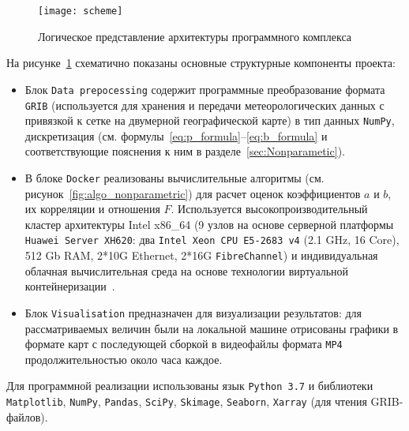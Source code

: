 \begin{figure}[!h]
	\centering
	\texttt{[image: scheme]}
	\caption{Логическое представление архитектуры программного комплекса}\label{fig:app_scheme}
\end{figure}


На рисунке~\ref{fig:app_scheme} схематично показаны основные структурные компоненты проекта:
\begin{itemize}
	\item Блок \verb"Data prepocessing" содержит программные преобразование формата \verb"GRIB" (используется для хранения и передачи метеорологических данных с привязкой к сетке на двумерной географической карте) в тип данных \verb"NumPy", дискретизация (см. формулы~\eqref{eq:p_formula}--\eqref{eq:b_formula} и соответствующие пояснения к ним в разделе~\ref{sec:Nonparametic}).
	\item В блоке \verb"Docker" реализованы вычислительные алгоритмы (см. рисунок~\ref{fig:algo_nonparametric}) для расчет оценок коэффициентов $a$ и $b$, их корреляции и отношения $F$. Используется высокопроизводительный кластер архитектуры Intel x86\_64 (9 узлов на основе серверной платформы \verb"Huawei Server XH620": два \verb"Intel Xeon CPU E5-2683 v4" (2.1 GHz, 16 Core), 512 Gb RAM, 2*10G Ethernet, 2*16G \verb"FibreChannel") и индивидуальная облачная вычислительная среда на основе технологии виртуальной контейнеризации~\cite{peinl2016docker}.
	\item Блок \verb"Visualisation" предназначен для визуализации результатов: для рассматриваемых величин были на локальной машине отрисованы графики в формате карт с последующей сборкой в видеофайлы формата \verb"MP4" продолжительностью около часа каждое.
\end{itemize}

Для программной реализации использованы язык \verb"Python 3.7" и библиотеки \verb"Matplotlib", \verb"NumPy", \verb"Pandas", \verb"SciPy", \verb"Skimage", \verb"Seaborn", \verb"Xarray" (для чтения GRIB-файлов).







